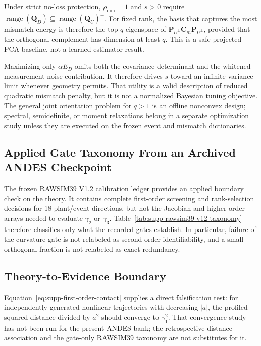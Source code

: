 Under strict no-loss protection, $\rho_{\min}=1$ and $s>0$ require
$\operatorname{range}(\bm Q_D)\subseteq\operatorname{range}(\bm Q_U)^\perp$.
For fixed rank, the basis that captures the most mismatch energy is therefore
the top-$q$ eigenspace of
$\bm P_{U^\perp}\bm C_m\bm P_{U^\perp}$, provided that the orthogonal
complement has dimension at least $q$.  This is a safe projected-PCA baseline,
not a learned-estimator result.

Maximizing only $\alpha E_D$ omits both the covariance determinant and the
whitened measurement-noise contribution.  It therefore drives $s$ toward an
infinite-variance limit whenever geometry permits.  That utility is a valid
description of reduced quadratic mismatch penalty, but it is not a normalized
Bayesian tuning objective.  The general joint orientation problem for $q>1$
is an offline nonconvex design; spectral, semidefinite, or moment relaxations
belong in a separate optimization study unless they are executed on the frozen
event and mismatch dictionaries.



\subsection{Applied Gate Taxonomy From an Archived ANDES Checkpoint}

The frozen RAWSIM39 V1.2 calibration ledger provides an applied boundary check
on the theory. It contains complete first-order screening and rank-selection
decisions for 18 plant/event directions, but not the Jacobian and higher-order
arrays needed to evaluate $\gamma_2$ or $\gamma_3$. Table~\ref{tab:supp-rawsim39-v12-taxonomy}
therefore classifies only what the recorded gates establish. In particular,
failure of the curvature gate is not relabeled as second-order
identifiability, and a small orthogonal fraction is not relabeled as exact
redundancy.





\subsection{Theory-to-Evidence Boundary}

Equation~\eqref{eq:supp-first-order-contact} supplies a direct falsification test:
for independently generated nonlinear trajectories with decreasing $|a|$, the
profiled squared distance divided by $a^2$ should converge to $\gamma_1^2$. That
convergence study has not been run for the present ANDES bank; the retrospective
distance association and the gate-only RAWSIM39 taxonomy are not substitutes
for it.

